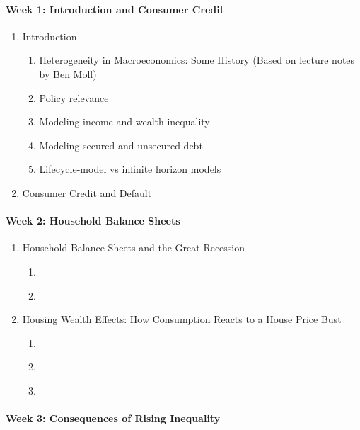 \documentclass[a4paper,11pt]{article}
\begin{document}
\paragraph{Week 1: Introduction and Consumer Credit}
\begin{enumerate}
\item Introduction
  \begin{enumerate}
  \item Heterogeneity in Macroeconomics: Some History (Based on lecture notes by Ben Moll)
  \item Policy relevance
  \item Modeling income and wealth inequality
  \item Modeling secured and unsecured debt
  \item Lifecycle-model vs infinite horizon models    
  \end{enumerate}

\item Consumer Credit and Default \citep{athreya2002welfare,chatterjee2007quantitative,livshits2007consumer}
\end{enumerate}

\paragraph{Week 2: Household Balance Sheets}

\begin{enumerate}
\item Household Balance Sheets and the Great Recession
  \begin{enumerate}
  \item \cite{mian2013household}
  \item \cite{berger2015consumption}
  \end{enumerate}
\item Housing Wealth Effects: How Consumption Reacts to a House Price Bust
  \begin{enumerate}
  \item \cite{berger2018house}
  \item \cite{guren2021housing}
  \item \cite{greimel2019understanding}
  \end{enumerate}
\end{enumerate}

\paragraph{Week 3: Consequences of Rising Inequality}
\end{document}
